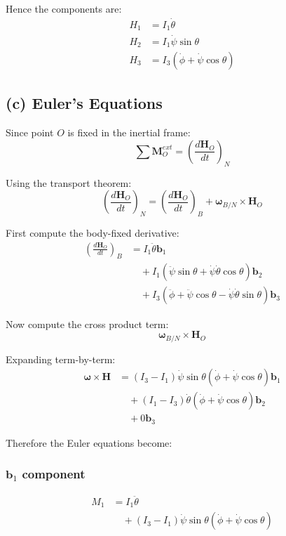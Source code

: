 Hence the components are:
\begin{align}
H_1 &= I_1\dot\theta
\\
H_2 &= I_1\dot\psi\sin\theta
\\
H_3 &= I_3(\dot\phi+\dot\psi\cos\theta)
\end{align}

\subsection*{(c) Euler's Equations}

Since point $O$ is fixed in the inertial frame:
\[
\sum \mathbf{M}_O^{ext}
=
\left(\frac{d\mathbf{H}_O}{dt}\right)_N
\]

Using the transport theorem:
\[
\left(\frac{d\mathbf{H}_O}{dt}\right)_N
=
\left(\frac{d\mathbf{H}_O}{dt}\right)_B
+
\bm{\omega}_{B/N}\times\mathbf{H}_O
\]

First compute the body-fixed derivative:
\begin{align}
\left(\frac{d\mathbf{H}_O}{dt}\right)_B
&=
I_1\ddot\theta\mathbf{b}_1
\\
&\quad
+
I_1(\ddot\psi\sin\theta+\dot\psi\dot\theta\cos\theta)\mathbf{b}_2
\\
&\quad
+
I_3(\ddot\phi+\ddot\psi\cos\theta
-\dot\psi\dot\theta\sin\theta)\mathbf{b}_3
\end{align}

Now compute the cross product term:
\[
\bm{\omega}_{B/N}\times\mathbf{H}_O
\]

Expanding term-by-term:
\begin{align}
\bm{\omega}\times\mathbf{H}
&=
(I_3-I_1)\dot\psi\sin\theta(\dot\phi+\dot\psi\cos\theta)\mathbf{b}_1
\\
&\quad
+
(I_1-I_3)\dot\theta(\dot\phi+\dot\psi\cos\theta)\mathbf{b}_2
\\
&\quad
+0\mathbf{b}_3
\end{align}

Therefore the Euler equations become:

\subsubsection*{$\mathbf{b}_1$ component}

\begin{align}
M_1
&=
I_1\ddot\theta
\\
&\quad
+
(I_3-I_1)
\dot\psi\sin\theta
(\dot\phi+\dot\psi\cos\theta)
\end{align}

